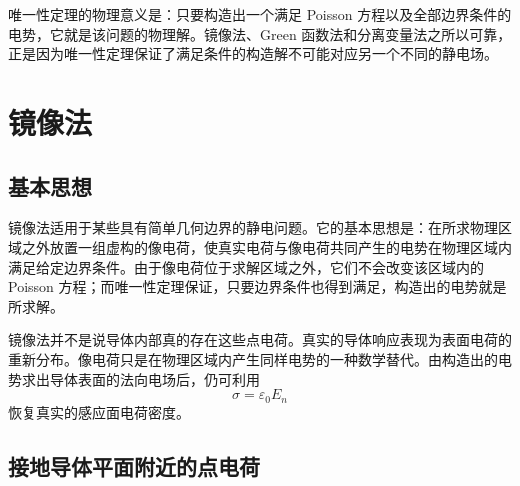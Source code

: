唯一性定理的物理意义是：只要构造出一个满足 Poisson 方程以及全部边界条件的电势，它就是该问题的物理解。镜像法、Green 函数法和分离变量法之所以可靠，正是因为唯一性定理保证了满足条件的构造解不可能对应另一个不同的静电场。

\section{镜像法}

\subsection{基本思想}

镜像法适用于某些具有简单几何边界的静电问题。它的基本思想是：在所求物理区域之外放置一组虚构的像电荷，使真实电荷与像电荷共同产生的电势在物理区域内满足给定边界条件。由于像电荷位于求解区域之外，它们不会改变该区域内的 Poisson 方程；而唯一性定理保证，只要边界条件也得到满足，构造出的电势就是所求解。

镜像法并不是说导体内部真的存在这些点电荷。真实的导体响应表现为表面电荷的重新分布。像电荷只是在物理区域内产生同样电势的一种数学替代。由构造出的电势求出导体表面的法向电场后，仍可利用
\[
\sigma
=
\varepsilon_{0}E_{n}
\]
恢复真实的感应面电荷密度。

\subsection{接地导体平面附近的点电荷}

